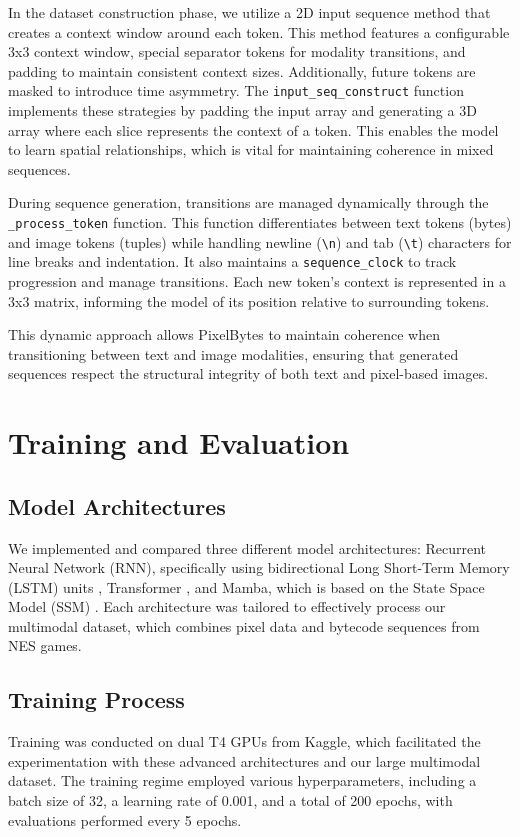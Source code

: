 \documentclass[10pt,a4paper]{article}
\begin{document}
In the dataset construction phase, we utilize a 2D input sequence method that creates a context window around each token. This method features a configurable 3x3 context window, special separator tokens for modality transitions, and padding to maintain consistent context sizes. Additionally, future tokens are masked to introduce time asymmetry. The \texttt{input\_seq\_construct} function implements these strategies by padding the input array and generating a 3D array where each slice represents the context of a token. This enables the model to learn spatial relationships, which is vital for maintaining coherence in mixed sequences.

During sequence generation, transitions are managed dynamically through the \texttt{\_process\_token} function. This function differentiates between text tokens (bytes) and image tokens (tuples) while handling newline (\texttt{\textbackslash n}) and tab (\texttt{\textbackslash t}) characters for line breaks and indentation. It also maintains a \texttt{sequence\_clock} to track progression and manage transitions. Each new token's context is represented in a 3x3 matrix, informing the model of its position relative to surrounding tokens.

This dynamic approach allows PixelBytes to maintain coherence when transitioning between text and image modalities, ensuring that generated sequences respect the structural integrity of both text and pixel-based images.


\section{Training and Evaluation}

\subsection{Model Architectures}
We implemented and compared three different model architectures: Recurrent Neural Network (RNN), specifically using bidirectional Long Short-Term Memory (LSTM) units \cite{hochreiter1997long}, Transformer \cite{vaswani2017attention}, and Mamba, which is based on the State Space Model (SSM) \cite{gu2022efficiently}. Each architecture was tailored to effectively process our multimodal dataset, which combines pixel data and bytecode sequences from NES games.

\subsection{Training Process}
Training was conducted on dual T4 GPUs from Kaggle, which facilitated the experimentation with these advanced architectures and our large multimodal dataset. The training regime employed various hyperparameters, including a batch size of 32, a learning rate of 0.001, and a total of 200 epochs, with evaluations performed every 5 epochs.
\end{document}
